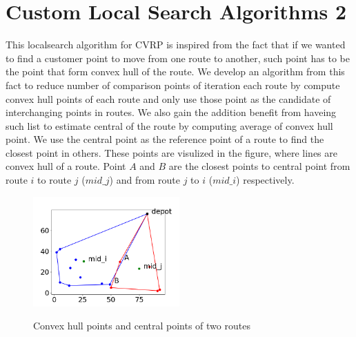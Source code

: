 \documentclass[12pt]{article}
\begin{document}
\section{Custom Local Search Algorithms 2} \label{ls2}
This localsearch algorithm for CVRP is inspired from the fact that if we wanted to find a customer point to move from one route to another, such point has to be the point that form convex hull of the route. We develop an algorithm from this fact to reduce number of comparison points of iteration each route by compute convex hull points of each route and only use those point as the candidate of interchanging points in routes. We also gain the addition benefit from haveing such list to estimate central of the route by computing average of convex hull point. We use the central point as the reference point of a route to find the closest point in others. These points are visulized in the figure, where lines are convex hull of a route. Point \(A\) and \(B\) are the closest points to central point from route \(i\) to route \(j\) (\(mid\_j\)) and from route \(j\) to \(i\) (\(mid\_i\)) respectively.

\begin{figure}[H]
	\caption{Convex hull points and central points of two routes}
	\centering
	\includegraphics[width=0.5\textwidth]{convexmidclosest.png}
	\label{fig:localsearch1}

\end{figure}
\end{document}
